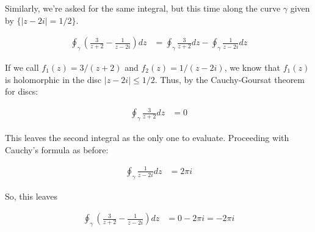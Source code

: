 Similarly, we're asked for the same integral, but this time along the curve
$\gamma$ given by $\{|z - 2i| = 1/2\}$.

\begin{align*}
    \oint_{\gamma}\left(\frac{3}{z+2}-\frac{1}{z-2i}\right)dz & =
    \oint_{\gamma}\frac{3}{z+2}dz - \oint_{\gamma}\frac{1}{z-2i}dz
\end{align*}

If we call $f_1(z) = 3/(z+2)$ and $f_2(z) = 1/(z-2i)$, we know that $f_1(z)$ is
holomorphic in the disc $|z - 2i| \leq 1/2$. Thus, by the Cauchy-Goursat
theorem for discs:

\begin{align*}
    \oint_{\gamma}\frac{3}{z+2}dz & = 0
\end{align*}

This leaves the second integral as the only one to evaluate. Proceeding with
Cauchy's formula as before:

\begin{align*}
    \oint_{\gamma}\frac{1}{z-2i}dz & = 2\pi i
\end{align*}

So, this leaves

\begin{align*}
    \oint_{\gamma}\left(\frac{3}{z+2}-\frac{1}{z-2i}\right)dz & = 0 - 2\pi i = -2\pi i
\end{align*}